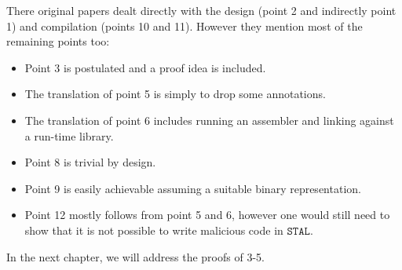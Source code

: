 There original papers\cite{TAL}\cite{STAL} dealt directly with the design (point
2 and indirectly point 1) and compilation (points 10 and 11). However they
mention most of the remaining points too:

\begin{itemize}
\item Point 3 is postulated and a proof idea is included.
\item The translation of point 5 is simply to drop some annotations.
\item The translation of point 6 includes running an assembler and linking
  against a run-time library.
\item Point 8 is trivial by design.
\item Point 9 is easily achievable assuming a suitable binary representation.
\item Point 12 mostly follows from point 5 and 6, however one would still need
  to show that it is not possible to write malicious code in $\mathtt{STAL}$.
\end{itemize}

In the next chapter, we will address the proofs of 3-5.
